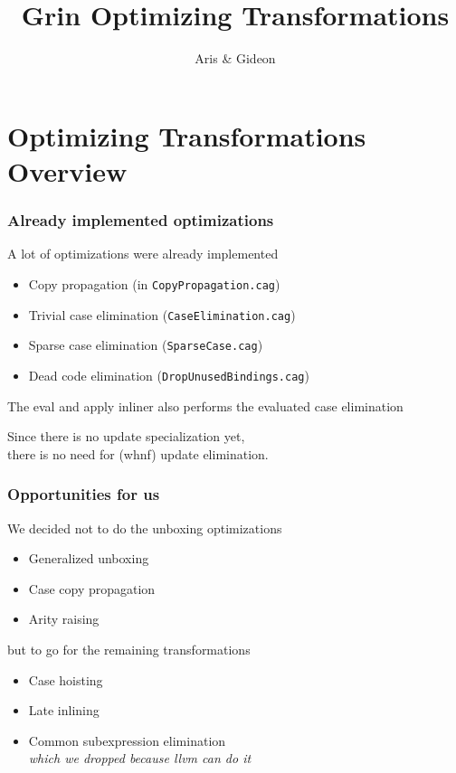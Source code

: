 \documentclass{beamer}
\title[GRIN]{Grin Optimizing Transformations}
\author[]{Aris \& Gideon}
\institute[]{Efficient Implementation of Functional Languages Seminar 2006}
\begin{document}
\begin{frame}
\maketitle
\end{frame}
\begin{frame}
\tableofcontents
\end{frame}

\section{Optimizing Transformations Overview}
\begin{frame}[fragile]
\frametitle{Already implemented optimizations}

A lot of optimizations were already implemented
\begin{itemize}
\item Copy propagation (in \texttt{CopyPropagation.cag})
\item Trivial case elimination (\texttt{CaseElimination.cag})
\item Sparse case elimination (\texttt{SparseCase.cag})
\item Dead code elimination (\texttt{DropUnusedBindings.cag})
\end{itemize}

\vspace{0.7cm}

The eval and apply inliner also performs the evaluated case elimination

\vspace{0.7cm}

Since there is no update specialization yet, \\
there is no need for (whnf) update elimination.
\end{frame}



\begin{frame}[fragile]
\frametitle{Opportunities for us}

We decided not to do the unboxing optimizations
\begin{itemize}
\item Generalized unboxing
\item Case copy propagation
\item Arity raising
\end{itemize}

\vspace{0.6cm}

but to go for the remaining transformations
\begin{itemize}
\item Case hoisting
\item Late inlining
\item Common subexpression elimination \\
\emph{which we dropped because llvm can do it}
\end{itemize}
\end{frame}
\end{document}
